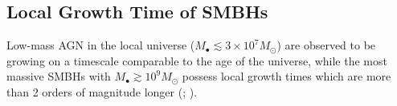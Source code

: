 \documentclass[usenatbib,fleqn]{mn2e}
\begin{document}
  


\subsection{Local Growth Time of SMBHs }
\label{sec:growth}

Low-mass AGN in the local universe ($M_{\bullet} \lesssim 3\times
10^{7}M_{\odot}$) are observed to be growing on a timescale comparable
to the age of the universe, while the most massive SMBHs with
$M_{\bullet} \gtrsim 10^{9}M_{\odot}$ possess local growth times which
are more than 2 orders of magnitude longer (\citealt{Heckman+04};
\citealt{Kauffmann&Heckman09}).
\end{document}
